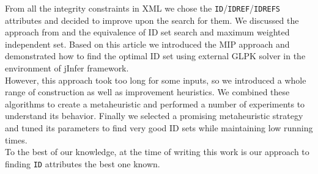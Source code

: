 
From all the integrity constraints in XML we chose the \texttt{ID}/\.\texttt{IDREF}/\.\texttt{IDREFS} attributes and decided to improve upon the search for them. We discussed the approach from \cite{fidax} and the equivalence of ID set search and maximum weighted independent set. Based on this article we introduced the MIP approach and demonstrated how to find the optimal ID set using external GLPK solver in the environment of jInfer framework.\\

However, this approach took too long for some inputs, so we introduced a whole range of construction as well as improvement heuristics. We combined these algorithms to create a metaheuristic and performed a number of experiments to understand its behavior. Finally we selected a promising metaheuristic strategy and tuned its parameters to find very good ID sets while maintaining low running times.\\

To the best of our knowledge, at the time of writing this work is our approach to finding \texttt{ID} attributes the best one known.
